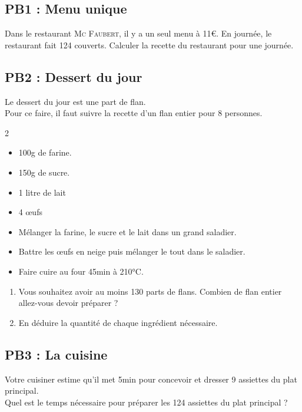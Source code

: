 \subsection*{PB1 : Menu unique} 

Dans le restaurant \textsc{Mc Faubert}, il y a un seul menu à 11€. En journée, le restaurant fait 124 couverts. 
Calculer la recette du restaurant pour une journée.

\subsection*{PB2 : Dessert du jour} 

Le dessert du jour est une part de flan. \\
Pour ce faire, il faut suivre la recette d'un flan entier pour 8 personnes. 
\begin{multicols}{2}

\begin{itemize}[label={$\bullet$}]
  \item 100g de farine. 
  \item 150g de sucre.
  \item 1 litre de lait
  \item 4 œufs
\end{itemize} \columnbreak

\begin{itemize}[label={$\bullet$}]
  \item Mélanger la farine, le sucre et le lait dans un grand saladier. 
  \item Battre les œufs en neige puis mélanger le tout dans le saladier.
  \item Faire cuire au four 45min à 210°C. 
\end{itemize}
\end{multicols}

\begin{enumerate}
  \item Vous souhaitez avoir au moins 130 parts de flans. Combien de flan entier allez-vous devoir préparer ? 
  \item En déduire la quantité de chaque ingrédient nécessaire.  
\end{enumerate} 

\subsection*{PB3 : La cuisine} 
Votre cuisiner estime qu'il met 5min pour concevoir et dresser 9 assiettes du plat principal. \\
Quel est le temps nécessaire pour préparer les 124 assiettes du plat principal ?

